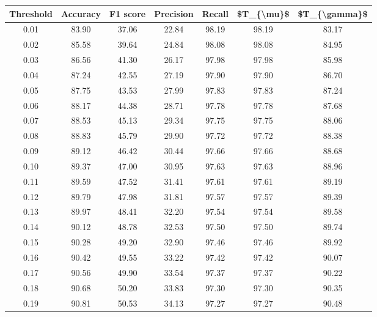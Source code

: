 \begin{tabular}{|c|c|c|c|c|c|c|}
\hline
 Threshold &  Accuracy &  F1 score &  Precision &  Recall &  \$T\_\{\textbackslash mu\}\$ &  \$T\_\{\textbackslash gamma\}\$ \\
\hline
      0.01 &     83.90 &     37.06 &      22.84 &   98.19 &      98.19 &         83.17 \\
      0.02 &     85.58 &     39.64 &      24.84 &   98.08 &      98.08 &         84.95 \\
      0.03 &     86.56 &     41.30 &      26.17 &   97.98 &      97.98 &         85.98 \\
      0.04 &     87.24 &     42.55 &      27.19 &   97.90 &      97.90 &         86.70 \\
      0.05 &     87.75 &     43.53 &      27.99 &   97.83 &      97.83 &         87.24 \\
      0.06 &     88.17 &     44.38 &      28.71 &   97.78 &      97.78 &         87.68 \\
      0.07 &     88.53 &     45.13 &      29.34 &   97.75 &      97.75 &         88.06 \\
      0.08 &     88.83 &     45.79 &      29.90 &   97.72 &      97.72 &         88.38 \\
      0.09 &     89.12 &     46.42 &      30.44 &   97.66 &      97.66 &         88.68 \\
      0.10 &     89.37 &     47.00 &      30.95 &   97.63 &      97.63 &         88.96 \\
      0.11 &     89.59 &     47.52 &      31.41 &   97.61 &      97.61 &         89.19 \\
      0.12 &     89.79 &     47.98 &      31.81 &   97.57 &      97.57 &         89.39 \\
      0.13 &     89.97 &     48.41 &      32.20 &   97.54 &      97.54 &         89.58 \\
      0.14 &     90.12 &     48.78 &      32.53 &   97.50 &      97.50 &         89.74 \\
      0.15 &     90.28 &     49.20 &      32.90 &   97.46 &      97.46 &         89.92 \\
      0.16 &     90.42 &     49.55 &      33.22 &   97.42 &      97.42 &         90.07 \\
      0.17 &     90.56 &     49.90 &      33.54 &   97.37 &      97.37 &         90.22 \\
      0.18 &     90.68 &     50.20 &      33.83 &   97.30 &      97.30 &         90.35 \\
      0.19 &     90.81 &     50.53 &      34.13 &   97.27 &      97.27 &         90.48 \\

\end{tabular}

